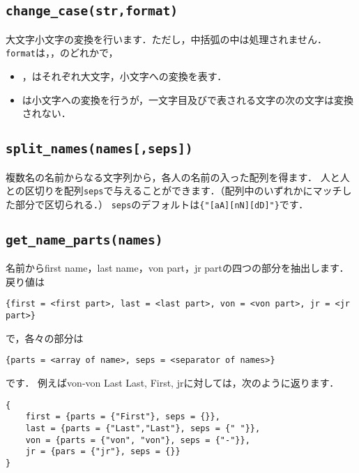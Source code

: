\documentclass[a4paper,lualatex]{jlreq}
\makeatletter
\newcommand{\luafunc}[1]{\texttt{#1}}
\def\luastring{\@ifstar{\luastring@s}{\luastring@}}
\newcommand*{\luastring@s}[1]{``\texttt{#1}''}
\newcommand*{\luavar}[1]{\texttt{#1}}
\makeatother
\begin{document}
\subsection{\luafunc{change\_case(str,format)}}
大文字小文字の変換を行います．ただし，中括弧の中は処理されません．
\luavar{format}は\luastring{t}，\luastring{u}，\luastring{l}のどれかで，
\begin{itemize}
\item \luastring{u}，\luastring{l}はそれぞれ大文字，小文字への変換を表す．
\item \luastring{t}は小文字への変換を行うが，一文字目及び\luastring{: *}で表される文字の次の文字は変換されない．
\end{itemize}


\subsection{\luafunc{split\_names(names[,seps])}}
複数名の名前からなる文字列から，各人の名前の入った配列を得ます．
人と人との区切りを配列\luavar{seps}で与えることができます．（配列中のいずれかにマッチした部分で区切られる．）
\luavar{seps}のデフォルトは\verb|{"[aA][nN][dD]"}|です．

\subsection{\luafunc{get\_name\_parts(names)}}
名前からfirst name，last name，von part，jr partの四つの部分を抽出します．
戻り値は
\begin{lstlisting}
{first = <first part>, last = <last part>, von = <von part>, jr = <jr part>}
\end{lstlisting}
で，各々の部分は
\begin{lstlisting}
{parts = <array of name>, seps = <separator of names>}
\end{lstlisting}
です．%
例えばvon-von Last Last, First, jrに対しては，次のように返ります．
\begin{lstlisting}
{
	first = {parts = {"First"}, seps = {}},
	last = {parts = {"Last","Last"}, seps = {" "}},
	von = {parts = {"von", "von"}, seps = {"-"}},
	jr = {pars = {"jr"}, seps = {}}
}
\end{lstlisting}
\end{document}

